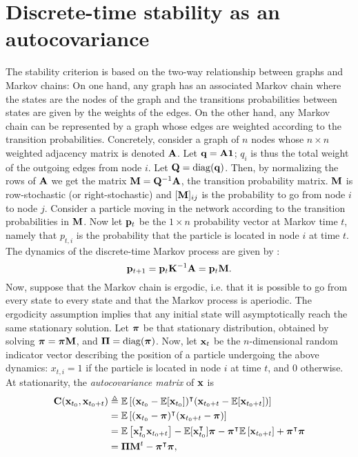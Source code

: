 \section{Discrete-time stability as an autocovariance}
The stability criterion is based on the two-way relationship between graphs and Markov chains: On one hand, any graph has an associated Markov chain where the states are the nodes of the graph and the transitions probabilities between states are given by the weights of the edges. On the other hand, any Markov chain can be represented by a graph whose edges are weighted according to the transition probabilities. Concretely, consider a graph of $n$ nodes whose $n \times n$ weighted adjacency matrix is denoted $\mathbf A$. Let $\mathbf q = \mathbf A \mathbf 1$; $q_i$ is thus the total weight of the outgoing edges from node $i$. Let $\mathbf Q = \mathrm{diag}(\mathbf q)$. Then, by normalizing the rows of $\mathbf A$ we get the matrix $\mathbf M = \mathbf Q^{-1}\mathbf A$, the transition probability matrix. $\mathbf M$ is row-stochastic (or right-stochastic) and $[\mathbf M]_{ij}$ is the probability to go from node $i$ to node $j$. 
Consider a particle moving in the network according to the transition probabilities in $\mathbf M$. Now let $\mathbf p_t$ be the $1 \times n$ probability vector at Markov time $t$, namely that $p_{t,i}$ is the probability that the particle is located in node $i$ at time $t$. The dynamics of the discrete-time Markov process are given by :
\begin{equation} \label{eq:discreteMP}
	\mathbf p_{t+1} = \mathbf p_t \mathbf K^{-1}\mathbf A = \mathbf p_t \mathbf M.  	
\end{equation} 
Now, suppose that the Markov chain is ergodic, i.e. that it is possible to go from every state to every state and that the Markov process is aperiodic. The ergodicity assumption implies that any initial state will asymptotically reach the same stationary solution. Let $\boldsymbol \pi$ be that stationary distribution, obtained by solving $\boldsymbol \pi = \boldsymbol \pi \mathbf M$, and $\mathbf \Pi = \mathrm{diag}(\boldsymbol \pi)$. Now, let $\mathbf x_t$ be the $n$-dimensional random indicator vector describing the position of a particle undergoing the above dynamics: $x_{t,i} = 1$ if the particle is located in node $i$ at time $t$, and $0$ otherwise. At stationarity, the \textit{autocovariance matrix} of $\mathbf x$ is
\begin{subequations}
	\begin{align}
 	\mathbf C(\mathbf x_{t_0},\mathbf x_{t_0+t}) &\triangleq \mathbb{E}\left[(\mathbf x_{t_0} - \mathbb{E}[\mathbf x_{t_0}])^{\intercal}(\mathbf x_{t_0+t} - \mathbb{E}[\mathbf x_{t_0+t}])\right] \\
 		&= \mathbb{E}\left[(\mathbf x_{t_0} - \boldsymbol \pi)^{\intercal}(\mathbf x_{t_0+t} - \boldsymbol \pi)\right] \\
 		&= \mathbb{E}\left[\mathbf x_{t_0}^{\intercal} \mathbf x_{t_0+t}\right] - \mathbb{E}[\mathbf x_{t_0}^{\intercal}] \boldsymbol \pi - \boldsymbol \pi^{\intercal} \mathbb{E}\left[\mathbf x_{t_0+t}\right] + \boldsymbol \pi^{\intercal} \boldsymbol \pi \\
 		&= \boldsymbol \Pi \mathbf M^t - \boldsymbol \pi^{\intercal} \boldsymbol \pi,
 	\end{align}
\end{subequations}
